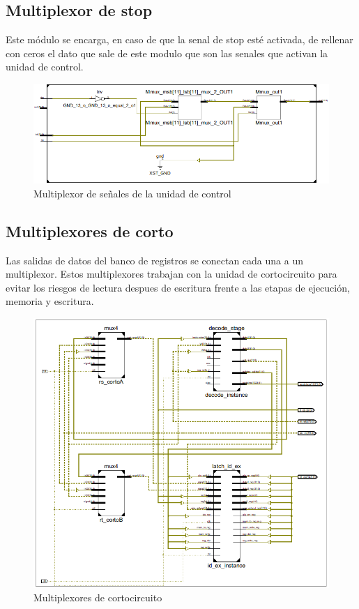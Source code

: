 \subsection{Multiplexor de stop}
Este m\'odulo se encarga, en caso de que la senal de stop est\'e activada, de rellenar con ceros el dato que sale de este modulo que son las senales que activan la unidad de control.

\begin{figure}[H]
\centering
\includegraphics[scale=0.5]{img/multiplexor_inside}
\caption{Multiplexor de señales de la unidad de control}
\label{fig:sign_extended}
\end{figure}

\subsection{Multiplexores de corto}
Las salidas de datos del banco de registros se conectan cada una a un multiplexor. Estos multiplexores trabajan con la unidad de cortocircuito para evitar los riesgos de lectura despues de escritura frente a las etapas de ejecuci\'on, memoria y escritura.

\begin{figure}[H]
\centering
\includegraphics[scale=0.5]{img/cortos}
\caption{Multiplexores de cortocircuito}
\label{fig:corto}
\end{figure}
